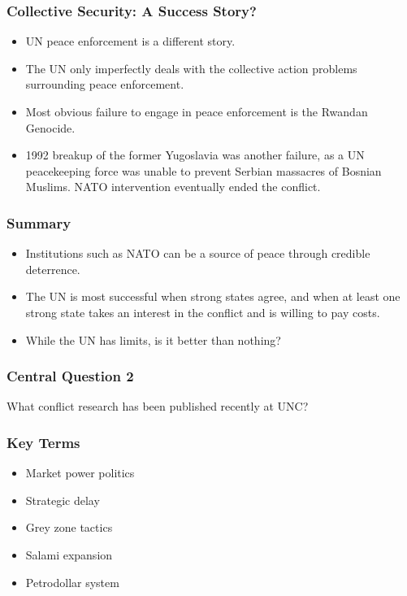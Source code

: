 \documentclass{beamer}
\begin{document}
\begin{frame} 
	\frametitle{\LARGE{Collective Security: A Success Story?}}
	\begin{itemize}
		\item UN peace enforcement is a different story. \pause
		\item The UN only imperfectly deals with the collective action problems surrounding peace enforcement. \pause
		\item Most obvious failure to engage in peace enforcement is the Rwandan Genocide. \pause
		\item 1992 breakup of the former Yugoslavia was another failure, as a UN peacekeeping force was unable to prevent Serbian massacres of Bosnian Muslims. NATO intervention eventually ended the conflict.
	\end{itemize}
\end{frame}

\begin{frame} 
	\frametitle{\LARGE{Summary}}
	\begin{itemize}
		\item Institutions such as NATO can be a source of peace through credible deterrence. \pause
		\item The UN is most successful when strong states agree, and when at least one strong state takes an interest in the conflict and is willing to pay costs. \pause
		\item While the UN has limits, is it better than nothing?		
	\end{itemize}
\end{frame}

\begin{frame} 
	\frametitle{\LARGE{Central Question 2}}
	\centering
	\Large{What conflict research has been published recently at UNC?}
\end{frame}

\begin{frame} 
	\frametitle{\LARGE{Key Terms}}
	\begin{itemize}
		\item Market power politics
		\item Strategic delay
		\item Grey zone tactics
		\item Salami expansion
		\item Petrodollar system
	\end{itemize}
\end{frame}
\end{document}

